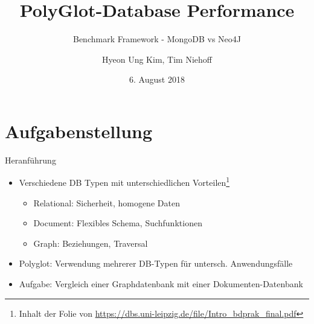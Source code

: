 \documentclass[12pt,usenames,dvipsnames]{beamer}
\title{PolyGlot-Database Performance}
\subtitle{Benchmark Framework - MongoDB vs Neo4J}
\author{Hyeon Ung Kim, Tim Niehoff}
\date{6. August 2018}
\begin{document}
	\maketitle
			
	\section{Aufgabenstellung}
	\begin{frame}{Heranführung}
	\begin{itemize}[<+- | alert@+>]
	\item Verschiedene DB Typen mit unterschiedlichen Vorteilen\footnote{ Inhalt der Folie von \url{https://dbs.uni-leipzig.de/file/Intro_bdprak_final.pdf}}
		\begin{itemize} [<+- | alert@+>]
	\item Relational: Sicherheit, homogene Daten
	\item Document: Flexibles Schema, Suchfunktionen
	\item Graph: Beziehungen, Traversal
	\end{itemize}
	\item Polyglot: Verwendung mehrerer DB-Typen für untersch. Anwendungsfälle
	\item Aufgabe: Vergleich einer
Graphdatenbank mit einer Dokumenten-Datenbank
	\end{itemize}	
	\end{frame}
\end{document}
